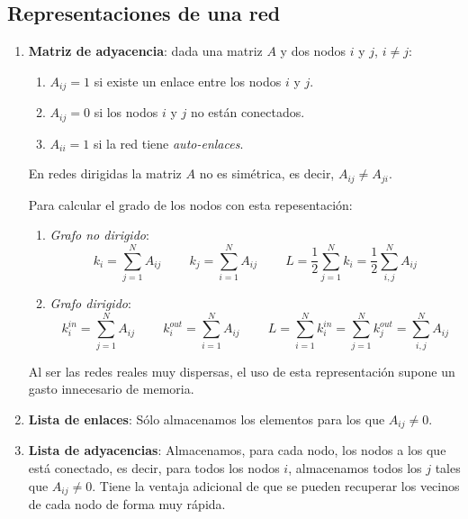 \documentclass[10pt,spanish, landscape, twocolumn]{article}
\begin{document}
\subsection{\textcolor{temados}Representaciones de una red}
\begin{enumerate}[\color{temados}{$\bullet$}]
    \item \textbf{\textcolor{temados}{Matriz de adyacencia}}: dada una matriz $A$ y dos nodos $i$ y $j$, $i \neq j$:
    \begin{enumerate}[---]
        \item $A_{ij} = 1$ si existe un enlace entre los nodos $i$ y $j$.
        \item $A_{ij} = 0$ si los nodos $i$ y $j$ no están conectados.
        \item $A_{ii} = 1$ si la red tiene \textit{\textcolor{temados}{auto-enlaces}}.
    \end{enumerate}

    En redes dirigidas la matriz $A$ no es simétrica, es decir, $A_{ij} \neq A_{ji}$.

    Para calcular el grado de los nodos con esta repesentación:

    \begin{enumerate}[---]
        \item \textit{\textcolor{temados}{Grafo no dirigido}}:
        \begin{displaymath}
            k_i = \sum_{j=1}^N A_{ij} \qquad\ k_j = \sum_{i=1}^N A_{ij} \qquad\ L = \frac{1}{2}\sum_{j=1}^N k_i = \frac{1}{2}\sum_{i,j}^N A_{ij}
        \end{displaymath}

        \item \textit{\textcolor{temados}{Grafo dirigido}}:
        \begin{displaymath}
            k_i^{in} = \sum_{j=1}^N A_{ij} \qquad\ k_i^{out} = \sum_{i=1}^N A_{ij} \qquad\ L = \sum_{i=1}^N k_i^{in} = \sum_{j=1}^N k_j^{out} = \sum_{i,j}^N A_{ij}
        \end{displaymath}
    \end{enumerate}

    Al ser las redes reales muy dispersas, el uso de esta representación supone un gasto innecesario de memoria.

    \item \textbf{\textcolor{temados}{Lista de enlaces}}: Sólo almacenamos los elementos para los que $A_{ij} \neq 0$.

    \item \textbf{\textcolor{temados}{Lista de adyacencias}}: Almacenamos, para cada nodo, los nodos a los que está conectado, es decir, para todos los nodos $i$, almacenamos todos los $j$ tales que $A_{ij} \neq 0$. Tiene la ventaja adicional de que se pueden recuperar los vecinos de cada nodo de forma muy rápida.
\end{enumerate}
\end{document}
